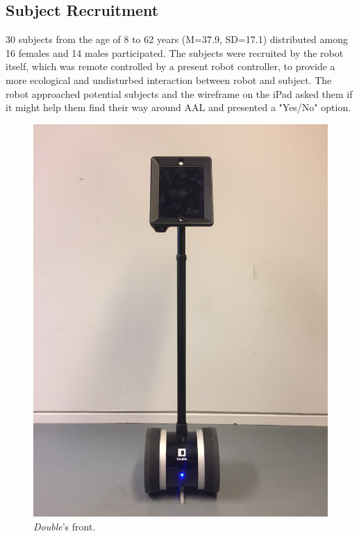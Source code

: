 \subsection{Subject Recruitment}
30 subjects from the age of 8 to 62 years (M=37.9, SD=17.1) distributed among 16 females and 14 males participated. The subjects were recruited by the robot itself, which was remote controlled by a present robot controller, to provide a more ecological and undisturbed interaction between robot and subject. The robot approached potential subjects and the wireframe on the iPad asked them if it might help them find their way around AAL and presented a "Yes/No" option. 
%
\begin{figure}[H]
\centering
\begin{minipage}{.25\textwidth}
  \centering
  \includegraphics[width=\linewidth, angle =-90]{Figure/ModificeretDoubleFront}
  \caption{\textit{Double}'s front.}
  \label{fig:ModificeretDoubleFront}
\end{minipage}%

\end{figure}
